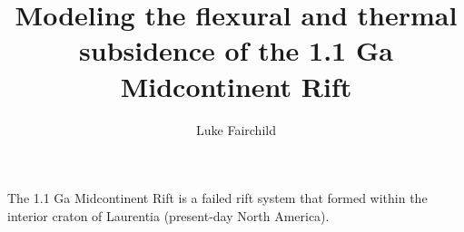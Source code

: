 \documentclass[11pt,a4paper]{article}
\title{Modeling the flexural and thermal subsidence of the 1.1 Ga Midcontinent Rift}
\author{Luke Fairchild}
\begin{document}
\maketitle{}
The 1.1 Ga Midcontinent Rift is a failed rift system that formed within the interior craton of Laurentia (present-day North America).



\end{document}
